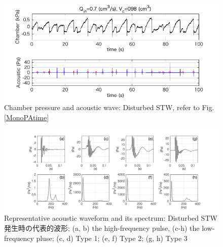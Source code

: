 \documentclass[12pt]{article}
\begin{document}
\begin{figure}[H]
\begin{center}
\includegraphics[scale=1] {DistPAtime.png} 
\caption{Chamber pressure and acoustic wave: Disturbed STW, refer to Fig. \ref{MonoPAtime}}
\label{DistPAtime}
\end{center}
\end{figure} 

\begin{landscape}
\begin{figure}[H]
\begin{center}
\includegraphics[scale=1] {Distwaveform.png} 
\caption{Representative acoustic waveform and its spectrum: Disturbed STW 発生時の代表的波形; (a, b) the high-frequency pulse, (c-h) the low-frequency pluse; (c, d) Type 1; (e, f) Type 2; (g, h) Type 3}
\label{Distwaveform}
\end{center}
\end{figure} 
\end{landscape}
\end{document}
